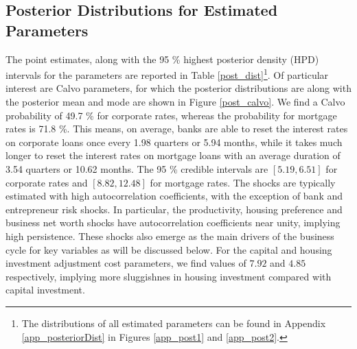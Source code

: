 \documentclass[12pt]{article}
\numberwithin{equation}{section}
\begin{document}

\subsection{Posterior Distributions for Estimated Parameters}

The point estimates, along with the 95 \% highest posterior density (HPD) intervals for the parameters are reported in Table \ref{post_dist}\footnote{The distributions of all estimated parameters can be found in Appendix \ref{app_posteriorDist} in Figures \ref{app_post1} and \ref{app_post2}.}. Of particular interest are Calvo parameters, for which the posterior distributions are along with the posterior mean and mode are shown in Figure \ref{post_calvo}. We find a Calvo probability of 49.7 \% for corporate rates, whereas the probability for mortgage rates is 71.8 \%. This means, on average, banks are able to reset the interest rates on corporate loans once every 1.98 quarters or 5.94 months, while it takes much longer to reset the interest rates on mortgage loans with an average duration of 3.54 quarters or 10.62 months. The 95 \% credible intervals are $[5.19, 6.51]$ for corporate rates and $[8.82,12.48]$ for mortgage rates. The shocks are typically estimated with high autocorrelation coefficients, with the exception of bank and entrepreneur risk shocks. In particular, the productivity, housing preference and business net worth shocks have autocorrelation coefficients near unity, implying high persistence. These shocks also emerge as the main drivers of the business cycle for key variables as will be discussed below. For the capital and housing investment adjustment cost parameters, we find values of $7.92$ and $4.85$ respectively, implying more sluggishnes in housing investment compared with capital investment. 
\end{document}
